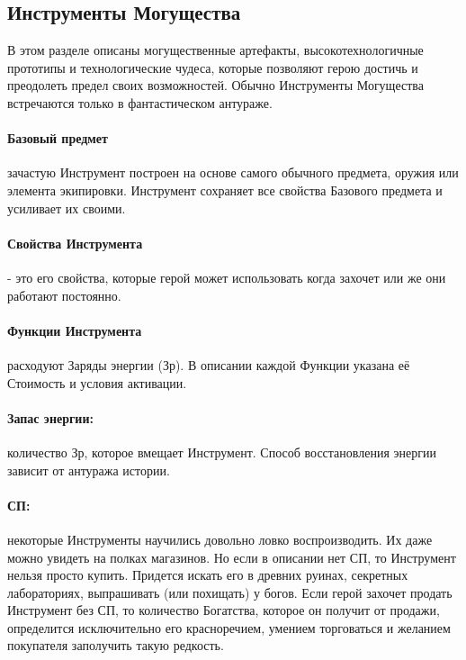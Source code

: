 \subsection{Инструменты Могущества}
В этом разделе описаны могущественные артефакты, высокотехнологичные прототипы и технологические чудеса, которые позволяют герою достичь и преодолеть предел своих возможностей. Обычно Инструменты Могущества встречаются только в фантастическом антураже.
\paragraph{Базовый предмет} зачастую Инструмент построен на основе самого обычного предмета, оружия или элемента экипировки. Инструмент сохраняет все свойства Базового предмета и усиливает их своими.
\paragraph{Свойства Инструмента} - это его свойства, которые герой может использовать когда захочет или же они работают постоянно.
\paragraph{Функции Инструмента} расходуют Заряды энергии (Зр). В описании каждой Функции указана её Стоимость и условия активации. 
\paragraph{Запас энергии:} количество Зр, которое вмещает Инструмент. Способ восстановления энергии зависит от антуража истории.
\paragraph{СП:} некоторые Инструменты научились довольно ловко воспроизводить. Их даже можно увидеть на полках магазинов. Но если в описании нет СП, то Инструмент нельзя просто купить. Придется искать его в древних руинах, секретных лабораториях, выпрашивать (или похищать) у богов. Если герой захочет продать Инструмент без СП, то количество Богатства, которое он получит от продажи, определится исключительно его красноречием, умением торговаться и желанием покупателя заполучить такую редкость.

